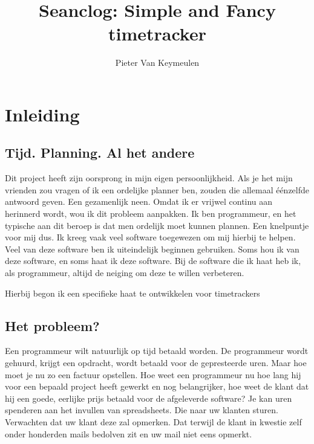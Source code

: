 \documentclass[a4paper,11pt]{article}
\begin{document}
\title{Seanclog: Simple and Fancy timetracker}
\author{Pieter Van Keymeulen}
\maketitle

\section{Inleiding}

\subsection{Tijd. Planning. Al het andere}
Dit project heeft zijn oorsprong in mijn eigen persoonlijkheid. Als je het mijn
vrienden zou vragen of ik een ordelijke planner ben, zouden die allemaal
éénzelfde antwoord geven. Een gezamenlijk neen. Omdat ik er vrijwel continu aan
herinnerd wordt, wou ik dit probleem aanpakken. Ik ben programmeur, en het
typische aan dit beroep is dat men ordelijk moet kunnen plannen. Een knelpuntje
voor mij dus. Ik kreeg vaak veel software toegewezen om mij hierbij te helpen.
Veel van deze software ben ik uiteindelijk beginnen gebruiken. Soms hou ik van
deze software, en soms haat ik deze software. Bij de software die ik haat heb
ik, als programmeur, altijd de neiging om deze te willen verbeteren.

Hierbij begon ik een specifieke haat te ontwikkelen voor timetrackers

\subsection{Het probleem?}
Een programmeur wilt natuurlijk op tijd betaald worden. De programmeur wordt
gehuurd, krijgt een opdracht, wordt betaald voor de gepresteerde uren. Maar hoe
moet je nu zo een factuur opstellen. Hoe weet een programmeur nu hoe lang hij
voor een bepaald project heeft gewerkt en nog belangrijker, hoe weet de klant
dat hij een goede, eerlijke prijs betaald voor de afgeleverde software? Je kan
uren spenderen aan het invullen van spreadsheets. Die naar uw klanten sturen.
Verwachten dat uw klant deze zal opmerken. Dat terwijl de klant in kwestie zelf
onder honderden mails bedolven zit en uw mail niet eens opmerkt.
\end{document}
